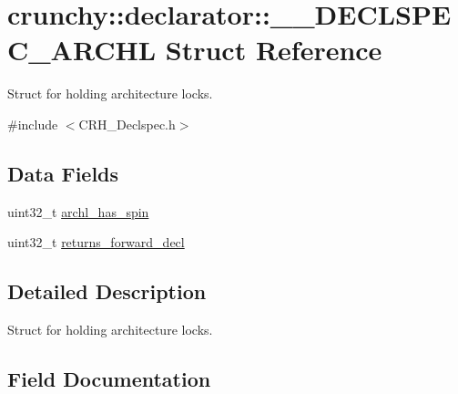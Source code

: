 \hypertarget{structcrunchy_1_1declarator_1_1_____d_e_c_l_s_p_e_c___a_r_c_h_l}{}\section{crunchy\+:\+:declarator\+:\+:\+\_\+\+\_\+\+D\+E\+C\+L\+S\+P\+E\+C\+\_\+\+A\+R\+C\+HL Struct Reference}
\label{structcrunchy_1_1declarator_1_1_____d_e_c_l_s_p_e_c___a_r_c_h_l}


Struct for holding architecture locks.  




{\ttfamily \#include $<$C\+R\+H\+\_\+\+Declspec.\+h$>$}

\subsection*{Data Fields}
\begin{DoxyCompactItemize}
\item 
uint32\+\_\+t \hyperlink{structcrunchy_1_1declarator_1_1_____d_e_c_l_s_p_e_c___a_r_c_h_l_aadc3174237edfc7511f0b8bd94fde0ba}{archl\+\_\+has\+\_\+spin}
\item 
uint32\+\_\+t \hyperlink{structcrunchy_1_1declarator_1_1_____d_e_c_l_s_p_e_c___a_r_c_h_l_a73a2d868629fed82ad40089b1a7066d4}{returns\+\_\+forward\+\_\+decl}
\end{DoxyCompactItemize}


\subsection{Detailed Description}
Struct for holding architecture locks. 

\subsection{Field Documentation}
